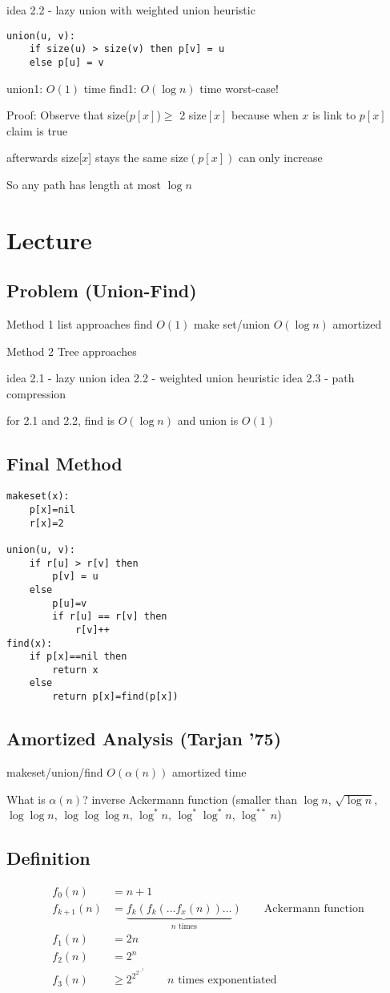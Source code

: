 \documentclass[english,12pt]{article}
\theoremstyle{plain}
\theoremstyle{definition}
\theoremstyle{definition} %
\begin{document}
idea 2.2 - lazy union with weighted union heuristic
\begin{verbatim}
union(u, v):
    if size(u) > size(v) then p[v] = u
    else p[u] = v
\end{verbatim}

union1: $O(1)$ time
find1: $O(\log n)$ time worst-case!

Proof: Observe that size($p[x]$)$\ge$ 2 size$[x]$
because when $x$ is link to $p[x]$ claim is true

afterwards size[$x$] stays the same size$(p[x])$ can only increase

So any path has length at most $\log n$
\section{Lecture}
\subsection{Problem (Union-Find)}
Method 1 list approaches
find $O(1)$
make set/union $O(\log n)$ amortized

Method 2 Tree approaches

idea 2.1 - lazy union
idea 2.2 - weighted union heuristic
idea 2.3 - path compression

for 2.1 and 2.2, find is $O(\log n)$ and union is $O(1)$

\subsection{Final Method}
\begin{verbatim}
makeset(x): 
    p[x]=nil
    r[x]=2

union(u, v):
    if r[u] > r[v] then
        p[v] = u
    else
        p[u]=v
        if r[u] == r[v] then
            r[v]++
find(x):
    if p[x]==nil then
        return x
    else
        return p[x]=find(p[x])
\end{verbatim}

\subsection{Amortized Analysis (Tarjan '75)}
makeset/union/find $O(\alpha(n))$ amortized time

What is $\alpha(n)$?  inverse Ackermann function
(smaller than $\log n$, $\sqrt{\log n}$, $\log\log n$, $\log\log\log n$, $\log^\ast n$, $\log^\ast\log^\ast n$, $\log^{\ast\ast}n$)

\subsection{Definition}
\begin{align*}
f_0(n) &= n+1\\
f_{k+1}(n) &=\underbrace{f_k(f_k(\ldots f_x(n))\ldots)}_{n\text{ times}}\qquad \text{Ackermann function}\\
f_1(n)&=2n\\
f_2(n)&=2^n\\
f_3(n)&\ge 2^{2^{2^{\ldots^2}}}\qquad n\text{ times exponentiated}
\end{align*}
\end{document}
